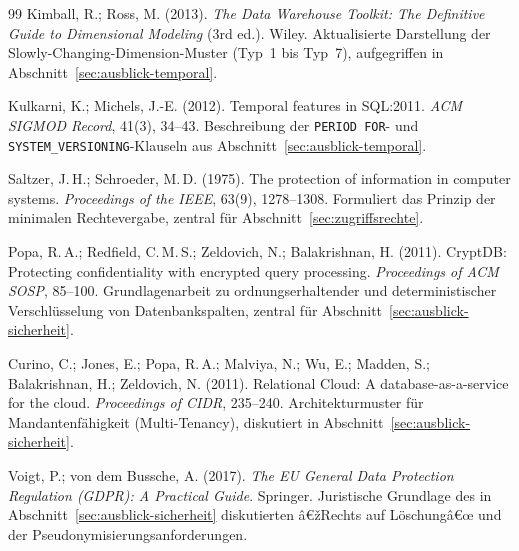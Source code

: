 ﻿\documentclass[a4paper,12pt]{report}
\theoremstyle{definition}
\theoremstyle{remark}
\begin{document}
\begin{thebibliography}{99}
Kimball, R.; Ross, M. (2013).
\newblock \emph{The Data Warehouse Toolkit: The Definitive Guide to
Dimensional Modeling} (3rd ed.).
\newblock Wiley.
\newblock Aktualisierte Darstellung der Slowly-Changing-Dimension-Muster
(Typ~1 bis Typ~7), aufgegriffen in
Abschnitt~\ref{sec:ausblick-temporal}.

Kulkarni, K.; Michels, J.-E. (2012).
\newblock Temporal features in SQL:2011.
\newblock \emph{ACM SIGMOD Record}, 41(3), 34--43.
\newblock Beschreibung der \texttt{PERIOD FOR}- und
\texttt{SYSTEM\_VERSIONING}-Klauseln aus
Abschnitt~\ref{sec:ausblick-temporal}.


Saltzer, J.\,H.; Schroeder, M.\,D. (1975).
\newblock The protection of information in computer systems.
\newblock \emph{Proceedings of the IEEE}, 63(9), 1278--1308.
\newblock Formuliert das Prinzip der minimalen Rechtevergabe,
zentral für Abschnitt~\ref{sec:zugriffsrechte}.

Popa, R.\,A.; Redfield, C.\,M.\,S.; Zeldovich, N.; Balakrishnan, H. (2011).
\newblock CryptDB: Protecting confidentiality with encrypted query processing.
\newblock \emph{Proceedings of ACM SOSP}, 85--100.
\newblock Grundlagenarbeit zu ordnungserhaltender und deterministischer
Verschlüsselung von Datenbankspalten, zentral für
Abschnitt~\ref{sec:ausblick-sicherheit}.

Curino, C.; Jones, E.; Popa, R.\,A.; Malviya, N.; Wu, E.; Madden, S.;
Balakrishnan, H.; Zeldovich, N. (2011).
\newblock Relational Cloud: A database-as-a-service for the cloud.
\newblock \emph{Proceedings of CIDR}, 235--240.
\newblock Architekturmuster für Mandantenfähigkeit (Multi-Tenancy),
diskutiert in Abschnitt~\ref{sec:ausblick-sicherheit}.

Voigt, P.; von dem Bussche, A. (2017).
\newblock \emph{The EU General Data Protection Regulation (GDPR): A
Practical Guide}.
\newblock Springer.
\newblock Juristische Grundlage des in
Abschnitt~\ref{sec:ausblick-sicherheit} diskutierten
â€žRechts auf Löschungâ€œ und der Pseudonymisierungsanforderungen.



\end{thebibliography}
\end{document}
